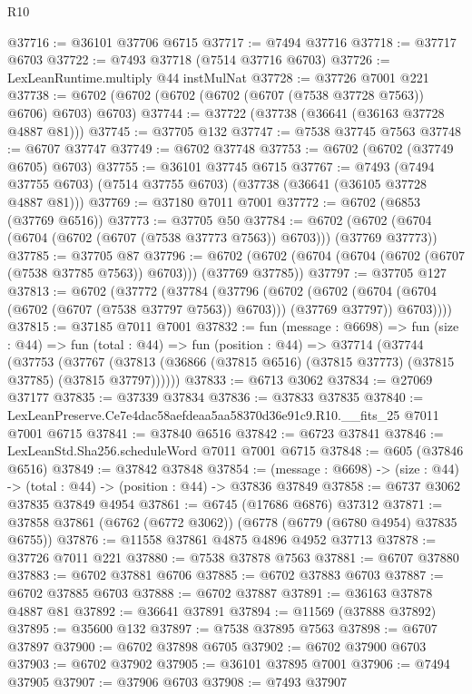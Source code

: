 \begin{lexlean}{R10}
\begin{coremodule}
@37716 := @36101 @37706 @6715
@37717 := @7494 @37716
@37718 := @37717 @6703
@37722 := @7493 @37718 (@7514 @37716 @6703)
@37726 := LexLeanRuntime.multiply @44 instMulNat
@37728 := @37726 @7001 @221
@37738 := @6702 (@6702 (@6702 (@6702 (@6707 (@7538 @37728 @7563)) @6706) @6703) @6703)
@37744 := @37722 (@37738 (@36641 (@36163 @37728 @4887 @81)))
@37745 := @37705 @132
@37747 := @7538 @37745 @7563
@37748 := @6707 @37747
@37749 := @6702 @37748
@37753 := @6702 (@6702 (@37749 @6705) @6703)
@37755 := @36101 @37745 @6715
@37767 := @7493
    (@7494 @37755 @6703)
    (@7514 @37755 @6703)
    (@37738 (@36641 (@36105 @37728 @4887 @81)))
@37769 := @37180 @7011 @7001
@37772 := @6702 (@6853 (@37769 @6516))
@37773 := @37705 @50
@37784 := @6702 (@6702 (@6704 (@6704 (@6702 (@6707 (@7538 @37773 @7563)) @6703))) (@37769 @37773))
@37785 := @37705 @87
@37796 := @6702 (@6702 (@6704 (@6704 (@6702 (@6707 (@7538 @37785 @7563)) @6703))) (@37769 @37785))
@37797 := @37705 @127
@37813 := @6702
    (@37772
      (@37784
        (@37796
          (@6702
            (@6702 (@6704 (@6704 (@6702 (@6707 (@7538 @37797 @7563)) @6703))) (@37769 @37797))
            @6703))))
@37815 := @37185 @7011 @7001
@37832 := fun (message : @6698) =>
  fun (size : @44) =>
  fun (total : @44) =>
  fun (position : @44) =>
  @37714
    (@37744
      (@37753
        (@37767 (@37813 (@36866 (@37815 @6516) (@37815 @37773) (@37815 @37785) (@37815 @37797))))))
@37833 := @6713 @3062
@37834 := @27069 @37177
@37835 := @37339 @37834
@37836 := @37833 @37835
@37840 := LexLeanPreserve.Ce7e4dac58aefdeaa5aa58370d36e91c9.R10.__fits_25 @7011 @7001 @6715
@37841 := @37840 @6516
@37842 := @6723 @37841
@37846 := LexLeanStd.Sha256.scheduleWord @7011 @7001 @6715
@37848 := @605 (@37846 @6516)
@37849 := @37842 @37848
@37854 := (message : @6698) -> (size : @44) -> (total : @44) -> (position : @44) -> @37836 @37849
@37858 := @6737 @3062 @37835 @37849 @4954
@37861 := @6745 (@17686 @6876) @37312
@37871 := @37858 @37861 (@6762 (@6772 @3062)) (@6778 (@6779 (@6780 @4954) @37835 @6755))
@37876 := @11558 @37861 @4875 @4896 @4952 @37713
@37878 := @37726 @7011 @221
@37880 := @7538 @37878 @7563
@37881 := @6707 @37880
@37883 := @6702 @37881 @6706
@37885 := @6702 @37883 @6703
@37887 := @6702 @37885 @6703
@37888 := @6702 @37887
@37891 := @36163 @37878 @4887 @81
@37892 := @36641 @37891
@37894 := @11569 (@37888 @37892)
@37895 := @35600 @132
@37897 := @7538 @37895 @7563
@37898 := @6707 @37897
@37900 := @6702 @37898 @6705
@37902 := @6702 @37900 @6703
@37903 := @6702 @37902
@37905 := @36101 @37895 @7001
@37906 := @7494 @37905
@37907 := @37906 @6703
@37908 := @7493 @37907

\end{coremodule}
\end{lexlean}
